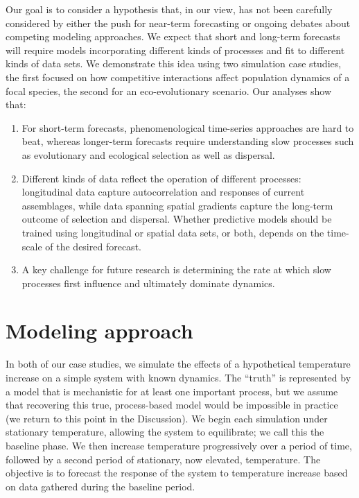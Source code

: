 \documentclass[11pt]{article}
\begin{document}
Our goal is to consider a hypothesis that, in our view, has not been carefully considered by either the push for near-term forecasting or
ongoing debates about competing modeling approaches. We expect that short and long-term forecasts will require models
incorporating different kinds of processes and fit to different kinds of data sets. We demonstrate this idea using two simulation case studies, the first 
focused on how competitive interactions affect population dynamics of a focal species, the second for  an 
eco-evolutionary scenario. Our analyses show that: 
\begin{enumerate}
	\item For short-term forecasts, phenomenological time-series approaches are hard to beat, whereas longer-term forecasts require understanding slow 
	processes such as evolutionary and ecological selection as well as dispersal.
	\item Different kinds of data reflect the operation of different processes: longitudinal data capture autocorrelation and responses of current assemblages, while 
	data spanning spatial gradients capture the long-term outcome of selection and dispersal.  Whether predictive models should be trained using longitudinal or
	spatial data sets, or both, depends on the time-scale of the desired forecast.
	\item A key challenge for future research is determining the rate at which slow processes first influence and ultimately dominate dynamics.
\end{enumerate}

\section*{Modeling approach}

In both of our case studies, we simulate the effects of a hypothetical temperature increase on a simple system with known dynamics.
The ``truth'' is represented by a model that is mechanistic for at least one important process, but we assume that recovering 
this true, process-based model would be impossible in practice (we return to this point in the Discussion). We begin each simulation
under stationary temperature, allowing the system to equilibrate; we call this the baseline phase. We then increase temperature progressively
over a period of time, followed by a second period of stationary, now elevated, temperature. The objective is to forecast the response of the 
system to temperature increase based on data gathered during the baseline period. 
\end{document}

